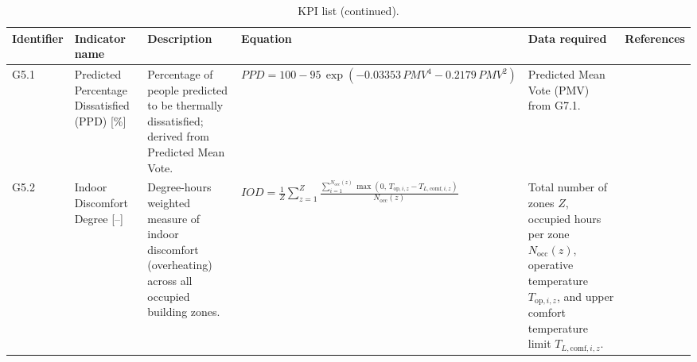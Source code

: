 \begin{table}
    \ContinuedFloat
    \centering
    \caption[]{KPI list (continued).}

    \fontsize{9.5pt}{11pt}\selectfont
    \setlength{\tabcolsep}{2pt}
    \renewcommand{\arraystretch}{0.95}

    \begin{tabularx}{\textheight}{%
        >{\centering\arraybackslash}m{1.0cm}
        >{\centering\arraybackslash}p{2.2cm}
        >{\centering\arraybackslash}X
        >{\centering\arraybackslash}X
        >{\centering\arraybackslash}X
        >{\centering\arraybackslash}X}
        \hline
        \textbf{Identifier} & \textbf{Indicator name} & \textbf{Description} & \textbf{Equation} & \textbf{Data required} & \textbf{References} \\
        \hline
        G5.1 & Predicted Percentage Dissatisfied (PPD) {[}\%{]} &
        Percentage of people predicted to be thermally dissatisfied; derived from Predicted Mean Vote. &
        \(\displaystyle PPD = 100 - 95\,\exp\!\left(-0.03353\,PMV^4 - 0.2179\,PMV^2\right)\) &
        Predicted Mean Vote (PMV) from G7.1. \\
        \hline
        G5.2 & Indoor Discomfort Degree {[}--{]} &
        Degree-hours weighted measure of indoor discomfort (overheating) across all occupied building zones. &
        \(\displaystyle IOD = \frac{1}{Z}\sum_{z=1}^{Z}\frac{\sum_{i=1}^{N_{\mathrm{occ}}(z)}\max\!\left(0,\,T_{\mathrm{op},i,z}-T_{L,\mathrm{comf},i,z}\right)}{N_{\mathrm{occ}}(z)}\) &
        Total number of zones $Z$, occupied hours per zone $N_{\mathrm{occ}}(z)$, operative temperature $T_{\mathrm{op},i,z}$, and upper comfort temperature limit $T_{L,\mathrm{comf},i,z}$. \\

\end{tabularx}
\end{table}

